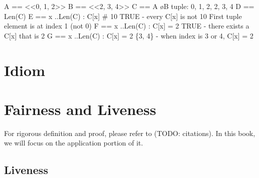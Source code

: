 \documentclass{report}
\begin{document}
\begin{tla}
A == <<0, 1, 2>>                    
B == <<2, 3, 4>>
C == A \o B                         \* tuple: 0, 1, 2, 2, 3, 4
D == Len(C)                         
E == \A x ..Len(C) : C[x] # 10 \* TRUE - every C[x] is not 10
                                    \* First tuple element is at index 1 (not 0)
F == \E x ..Len(C) : C[x] = 2  \* TRUE - there exists a C[x] that is 2
G == {x ..Len(C) : C[x] = 2}   \* \{3, 4\} - when index is 3 or 4, C[x] = 2
\end{tla}
\begin{tlatex}
%
%
%
%
\@xx{}%
%
%
\@xx{}%
%
\@xx{}%
%
%
\@xx{}%
%
\@xx{}%
%
\@xx{}%
\end{tlatex}

\chapter{Idiom}

\chapter{Fairness and Liveness}

For rigorous definition and proof, please refer to (TODO: citations). In this
book, we will focus on the application portion of it.

\section{Liveness}
\end{document}
